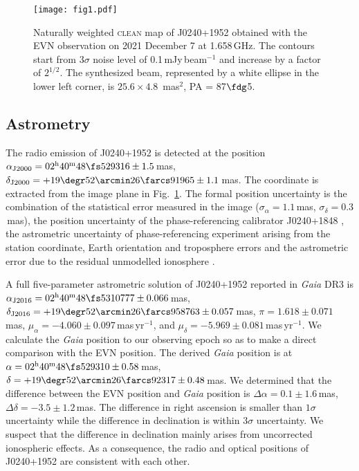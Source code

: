 \documentclass[fleqn,usenatbib]{mnras}
\begin{document}
\begin{figure}
\centering
\texttt{[image: fig1.pdf]}
\caption{Naturally weighted \textsc{clean} map of J0240+1952 obtained with the EVN observation on 2021 December 7 at 1.658\,GHz. The contours start from 3$\sigma$ noise level of 0.1\,mJy\,beam$^{-1}$ and increase by a factor of $2^{1/2}$. The synthesized beam, represented by a white ellipse in the lower left corner, is $25.6 \times 4.8$~mas$^2$, PA = 87$\fdg$5.}
 \label{fig:fig1}
\end{figure}

\subsection{Astrometry}

The radio emission of J0240+1952 is detected at the position $\alpha_{\rm J2000} =02^{\rm h}40^{\rm m}48\fs529316\pm1.5$\,mas, $\delta_{\rm J2000}=+19\degr52\arcmin26\farcs91965\pm1.1$\,mas. The coordinate is extracted from the image plane in Fig.~\ref{fig:fig1}. The formal position uncertainty is the combination of the statistical error measured in the image ($\sigma_{\alpha}=1.1$\,mas, $\sigma_{\delta}=0.3$\,mas), the position uncertainty of the phase-referencing calibrator J0240+1848 \citep[$\sigma_{\alpha}=0.13$\,mas, $\sigma_{\delta}=0.14$\,mas;][]{Beasley2002}, the astrometric uncertainty of phase-referencing experiment arising from the station coordinate, Earth orientation and troposphere errors \citep[$\sigma_{\alpha}=0.004$\,mas, $\sigma_{\delta}=0.006$\,mas;][]{Pradel2006} and the astrometric error due to the residual unmodelled ionosphere \citep[$\sim1$\,mas;][]{Rioja2020}.

A full five-parameter astrometric solution of J0240+1952 reported in \textit{Gaia} DR3 \citep{Gaia2023} is $\alpha_{\rm J2016} =02^{\rm h}40^{\rm m}48\fs5310777\pm0.066$\,mas, $\delta_{\rm J2016}=+19\degr52\arcmin26\farcs958763\pm0.057$\,mas, $\pi=1.618\pm0.071$\,mas, $\mu_{\alpha}=-4.060\pm0.097$\,mas\,yr$^{-1}$, and $\mu_{\delta}=-5.969\pm0.081$\,mas\,yr$^{-1}$. We calculate the \textit{Gaia} position to our observing epoch so as to make a direct comparison with the EVN position. The derived \textit{Gaia} position is at $\alpha =02^{\rm h}40^{\rm m}48\fs529310\pm0.58$\,mas, $\delta =+19\degr52\arcmin26\farcs92317\pm0.48$\,mas. We determined that the difference between the EVN position and \textit{Gaia} position is $\Delta\alpha=0.1\pm1.6$\,mas, $\Delta\delta=-3.5\pm1.2$\,mas. 
The difference in right ascension is smaller than $1\sigma$ uncertainty while the difference in declination is within $3\sigma$ uncertainty. We suspect that the difference in declination mainly arises from uncorrected ionospheric effects. As a consequence, the radio and optical positions of J0240+1952 are consistent with each other.
\end{document}
